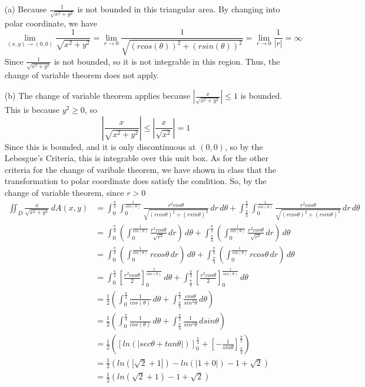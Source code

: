 \documentclass[11pt,letterpaper,cm]{nupset}
\begin{document}
\begin{solution}
	\begin{itemize}
		\item[(a)] Because $\frac{1}{\sqrt{x^2+y^2}}$ is not bounded in this triangular area. By changing into polar coordinate, we have
		$$\lim_{(x,y)\to(0,0)} \frac{1}{\sqrt{x^2+y^2}}=\lim_{r\to 0} \frac{1}{\sqrt{(rcos(\theta))^2+(rsin(\theta))^2}}=\lim_{r\to 0} \frac{1}{|r|}=\infty$$
		Since $\frac{1}{\sqrt{x^2+y^2}}$ is not bounded, so it is not integrable in this region. Thus, the change of variable theorem does not apply.
		\item[(b)] The change of variable theorem applies because $|\frac{x}{\sqrt{x^2+y^2}}|\leq 1$ is bounded. This is because $y^2\geq 0$, so
		$$|\frac{x}{\sqrt{x^2+y^2}}|\leq|\frac{x}{\sqrt{x^2}}|=1$$
		Since this is bounded, and it is only discontinuous at $(0,0)$, so by the Lebesgue's Criteria, this is integrable over this unit box. As for the other criteria for the change of varibale theorem, we have shown in class that the transformation to polar coordinate does satisfy the condition. So, by the change of variable theorem, since $r>0$
		\begin{align*}
			\iint_D \frac {x}{\sqrt{x^2+y^2}}\,dA(x,y)&=\int_0^\frac{\pi}{4}\int_0^\frac{1}{cos(\theta)} \frac {r^2cos\theta}{\sqrt{(rcos\theta)^2+(rsin\theta)^2}} \,dr\,d\theta+\int_\frac{\pi}{4}^\frac{\pi}{2}\int_0^\frac{1}{sin(\theta)} \frac {r^2cos\theta}{\sqrt{(rcos\theta)^2+(rsin\theta)^2}} \,dr\,d\theta\\
			&=\int_0^\frac{\pi}{4}(\int_0^\frac{1}{cos(\theta)} \frac {r^2cos\theta}{\sqrt{r^2}} \,dr)\,d\theta+\int_\frac{\pi}{4}^\frac{\pi}{2}(\int_0^\frac{1}{sin(\theta)} \frac {r^2cos\theta}{\sqrt{r^2}} \,dr)\,d\theta\\
			&=\int_0^\frac{\pi}{4}(\int_0^\frac{1}{cos(\theta)} rcos\theta \,dr)\,d\theta+\int_\frac{\pi}{4}^\frac{\pi}{2}(\int_0^\frac{1}{sin(\theta)} rcos\theta \,dr)\,d\theta\\
			&=\int_0^\frac{\pi}{4}[\frac{r^2cos\theta}{2}]_0^\frac{1}{cos(\theta)}\,d\theta+\int_\frac{\pi}{4}^\frac{\pi}{2}[\frac{r^2cos\theta}{2}]_0^\frac{1}{sin(\theta)}\,d\theta\\
			&=\frac{1}{2}(\int_0^\frac{\pi}{4} \frac{1}{cos(\theta)}\,d\theta+\int_\frac{\pi}{4}^\frac{\pi}{2} \frac{cos\theta}{sin^2\theta}\,d\theta)\\
			&=\frac{1}{2}(\int_0^\frac{\pi}{4} \frac{1}{cos(\theta)}\,d\theta+\int_\frac{\pi}{4}^\frac{\pi}{2} \frac{1}{sin^2\theta}\,dsin\theta)\\
			&=\frac{1}{2}([ln(|sec\theta+tan\theta|)]_0^\frac{\pi}{4}+[-\frac{1}{sin\theta}]_\frac{\pi}{4}^\frac{\pi}{2})\\
			&=\frac{1}{2}(ln(|\sqrt{2}+1|)-ln(|1+0|)-1+\sqrt{2})\\
			&=\frac{1}{2}(ln(\sqrt{2}+1)-1+\sqrt{2})
		\end{align*}
	\end{itemize}
\end{solution}
\newpage
\end{document}

